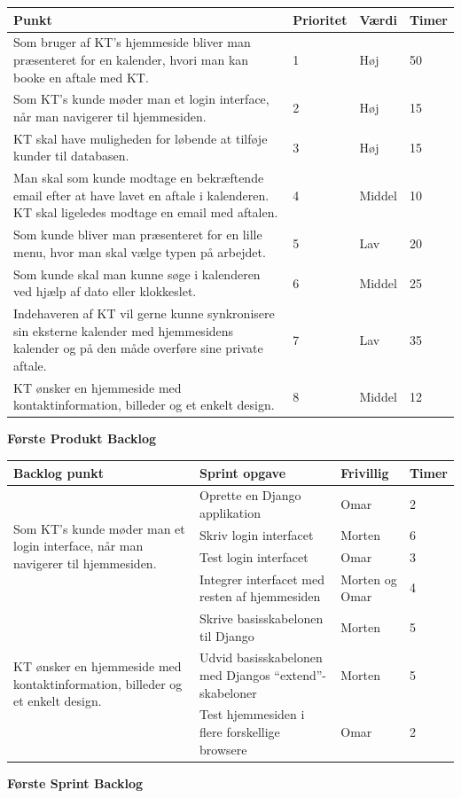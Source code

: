 \documentclass[12pt]{article}   %
\begin{document}
\begin{center}
	\begin{tabular}{|p{8cm}|l|l|l|}
		\hline
Punkt & Prioritet & Værdi & Timer \\ \hline
Som bruger af KT's hjemmeside bliver man præsenteret for en kalender, hvori man
kan booke en aftale med KT. & 1 & Høj &  50 \\ \hline
Som KT's kunde møder man et login interface, når man navigerer til hjemmesiden. & 2 &
Høj & 15  \\ \hline
KT skal have muligheden for løbende at tilføje kunder til databasen. & 3 & Høj
& 15 \\ \hline
Man skal som kunde modtage en bekræftende email efter at have lavet en aftale
i kalenderen. KT skal ligeledes modtage en email med aftalen. & 4 & Middel & 10  \\ \hline
Som kunde bliver man præsenteret for en lille menu, hvor man skal vælge typen
på arbejdet. & 5 & Lav & 20\\ \hline
Som kunde skal man kunne søge i kalenderen ved hjælp af dato eller klokkeslet.
& 6  & Middel &  25 \\ \hline
Indehaveren af KT vil gerne kunne synkronisere sin eksterne kalender med
hjemmesidens kalender og på den måde overføre sine private aftale. & 7 & Lav &
 35 \\ \hline
KT ønsker en hjemmeside med kontaktinformation, billeder og et enkelt design.
& 8 & Middel & 12 \\ \hline
\end{tabular}
\end{center}
\begin{center}\textbf{Første Produkt Backlog}
\end{center}
\vspace{0.5cm}



\begin{center}
	\begin{tabular}{|l|p{4cm}|l|l|}
		\hline
		Backlog punkt & Sprint opgave & Frivillig & Timer\\ \hline
		\multirow{4}{4cm}{Som KT's kunde møder man et login interface,
		når man navigerer til hjemmesiden.} & Oprette en Django
		applikation & Omar  & 2 \\
		& Skriv login interfacet & Morten & 6 \\
		& Test login interfacet & Omar & 3 \\
		& Integrer interfacet med resten af hjemmesiden & Morten og Omar
		& 4 \\ \hline
		\multirow{3}{4cm}{KT ønsker en hjemmeside med
		kontaktinformation, billeder og et enkelt design.} &
		Skrive basisskabelonen til Django & Morten & 5 \\
		& Udvid basisskabelonen med Djangos ``extend''-skabeloner & Morten & 5
		\\ & Test hjemmesiden i flere forskellige browsere & Omar & 2 \\
		\hline

	\end{tabular}
\end{center}

\begin{center}
\textbf{Første Sprint Backlog}
\end{center}

\vspace{0.5cm}
\end{document}
